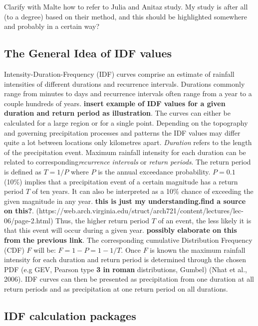 \documentclass[12pt]{article}
\begin{document}
{Clarify with Malte how to refer to Julia and Anitaz study. My study is after all (to a degree) based on their method, and this should be highlighted somewhere and probably in a certain way?

\subsection{The General Idea of IDF values} 


Intensity-Duration-Frequency (IDF) curves comprise an estimate of rainfall intensities of different durations and recurrence intervals. Durations commonly range from minutes to days and recurrence intervals often range from a year to a couple hundreds of years. \textbf{insert example of IDF values for a given duration and return period as illustration}. The curves can either be calculated for a large region or for a single point. Depending on the topography and governing precipitation processes and patterns the IDF values may differ quite a lot between locations only kilometres apart. \textit{Duration} refers to the length of the precipitation event. Maximum rainfall intensity for each duration can be related to corresponding\textit{recurrence intervals} or \textit{return periods}. The return period is defined as $T = 1/P$ where $P$ is the annual exceedance probability. $P = 0.1$  (10\%)  implies that a precipitation event of a certain magnitude has a return period $T$ of ten years. It can also be interpreted as a 10\% chance of exceeding the given magnitude in any year. \textbf{this is just my understanding.find a source on this?}. (https://web.arch.virginia.edu/struct/arch721/content/lectures/lec-06/page-2.html) Thus, the higher return period $T$ of an event, the less likely it is that this event will occur during a given year. \textbf{possibly elaborate on this from the previous link}. The corresponding cumulative Distribution Frequency (CDF) $F$ will be: $F = 1-P = 1-1/T$. Once $F$ is known the maximum rainfall intensity for each duration and return period is determined through the chosen PDF (e.g GEV, Pearson type \textbf{3 in roman} distributions, Gumbel) (Nhat et al., 2006). IDF curves can then be presented as precipitation from one duration at all return periods and as precipitation at one return period on all durations. 


\subsection{IDF calculation packages}

}
\end{document}
